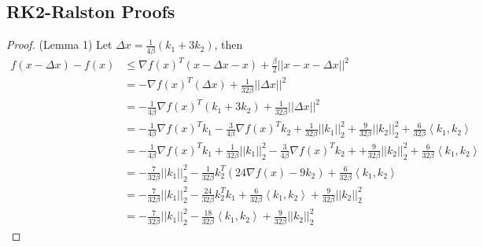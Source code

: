 \subsection{RK2-Ralston Proofs}

\begin{proof}(Lemma 1)
Let $\Delta x =  \frac{1}{4\beta}(k_1 + 3k_2)$, then
\begin{equation}
\begin{aligned}\label{ineq0}
f(x - \Delta x) - f(x) &\leq \nabla f(x)^T (x - \Delta x - x) + \frac{\beta}{2} || x - x - \Delta x ||^2 \\
&= -  \nabla f(x)^T ( \Delta x) + \frac{1}{32 \beta} || \Delta x ||^2 \\
&= -\frac{1}{4 \beta} \nabla  f(x)^T ( k_1 + 3k_2) + \frac{1}{32 \beta} || \Delta x ||^2 \\
&= -\frac{1}{4\beta}\nabla f(x)^T k_1 - \frac{3}{4\beta}\nabla f(x)^T k_2 + \frac{1}{32 \beta} || k_1 ||_2^2 + \frac{9}{32 \beta} || k_2 ||^2_2 + \frac{6}{32\beta}\left\langle k_1, k_2 \right\rangle \\
&= -\frac{1}{4\beta}\nabla f(x)^T k_1 +  \frac{1}{32 \beta} || k_1 ||_2^2 -  \frac{3}{4\beta}\nabla f(x)^T k_2 +  + \frac{9}{32 \beta} || k_2 ||^2_2  + \frac{6}{32\beta}\left\langle k_1, k_2 \right\rangle \\
&= -\frac{7}{32 \beta}|| k_1 ||_2^2 -\frac{1}{32 \beta}k_2^T(24 \nabla f(x) - 9 k_2) + \frac{6}{32\beta}\left\langle k_1, k_2 \right\rangle \\
&= -\frac{7}{32 \beta}|| k_1 ||_2^2 - \frac{24}{32 \beta}k_2^Tk_1 + \frac{6}{32 \beta}\left\langle k_1, k_2 \right\rangle + \frac{9}{32\beta}|| k_2 ||_2^2 \\
&= -\frac{7}{32 \beta}|| k_1 ||_2^2 - \frac{18}{32 \beta} \left\langle k_1, k_2 \right\rangle + \frac{9}{32 \beta}|| k_2 ||_2^2
\end{aligned}
\end{equation}


\end{proof}

